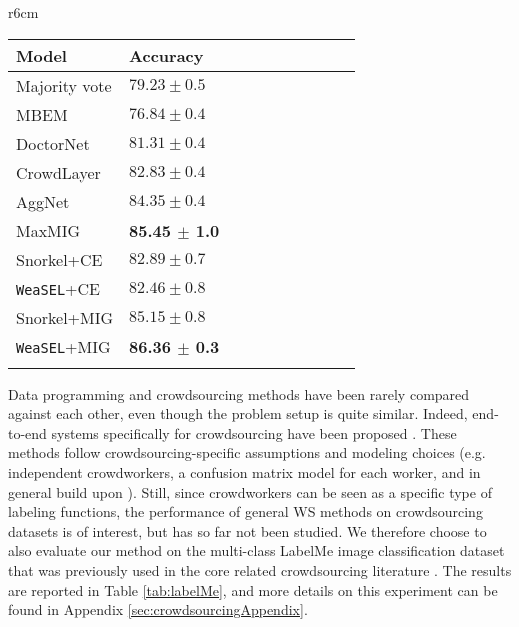 \documentclass{article}
\newcommand{\weasel}{\texttt{WeaSEL}}\newcommand{\brackets}[1]{\left( #1 \right)}
\newcommand{\first}[1]{{\color{blue}\textbf{#1}}}
\newcommand{\second}[1]{{\textbf{#1}}}
\begin{document}
\begin{wraptable}{r}{6cm}
\vspace{-4mm}
\caption{Test accuracy scores on the crowd-sourced, multi-class LabelMe image classification dataset.
}
\vspace{-3mm}
\begin{center}
\begin{tabular}{llllllllll}
\toprule
    Model & Accuracy \\ 
    \midrule
        Majority vote        & $79.23 \pm 0.5$\\  
        MBEM \cite{khetan2017learning} & $76.84 \pm 0.4$ \\
        DoctorNet \cite{doctorNet} & $81.31 \pm 0.4$\\ 
        CrowdLayer \cite{rodrigues2018deep} & $82.83 \pm 0.4$\\ 
        AggNet \cite{aggNet} & $84.35 \pm 0.4$ \\
        MaxMIG \cite{MaxMIG} & \second{85.45 $\pm$ 1.0}\\ 
        Snorkel+CE & $82.89 \pm 0.7$\\ 
        \weasel+CE & $82.46 \pm 0.8$\\             Snorkel+MIG & $85.15 \pm 0.8$\\ 
        \weasel+MIG & \first{86.36 $\pm$ 0.3}\\     \bottomrule
    \label{tab:labelMe}
\end{tabular}
\end{center}
\vspace{-5mm}
\end{wraptable} Data programming and crowdsourcing methods have been rarely compared against each other, even though the problem setup is quite similar.
Indeed, end-to-end systems specifically for crowdsourcing have been proposed \cite{raykar10a, khetan2017learning, rodrigues2018deep, MaxMIG}. These methods follow crowdsourcing-specific assumptions and modeling choices (e.g. independent crowdworkers, a confusion matrix model for each worker, and in general build upon \cite{SkeneModel}). 
Still, since crowdworkers can be seen as a specific type of labeling functions, the performance of general WS methods on crowdsourcing datasets is of interest, but has so far not been studied. We therefore choose to also evaluate our method on the multi-class LabelMe image classification dataset that was previously used in the core related crowdsourcing literature \cite{rodrigues2018deep, MaxMIG}.
The results are reported in Table \ref{tab:labelMe}, and more details on this experiment can be found in Appendix \ref{sec:crowdsourcingAppendix}.
\end{document}
